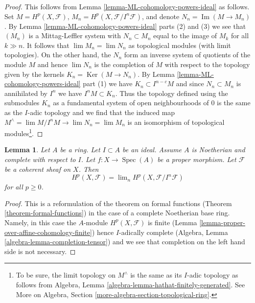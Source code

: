 \documentclass{stacks-project}
\theoremstyle{plain}
\newtheorem{lemma}[subsection]{Lemma}
\theoremstyle{definition}
\theoremstyle{remark}
\numberwithin{equation}{subsection}
\def\lim{\mathop{\mathrm{lim}}\nolimits}
\def\Spec{\mathop{\mathrm{Spec}}}
\def\Ker{\mathop{\mathrm{Ker}}}
\def\Im{\mathop{\mathrm{Im}}}
\begin{document}
\begin{proof}
This follows from Lemma \ref{lemma-ML-cohomology-powers-ideal} as follows.
Set $M = H^p(X, \mathcal{F})$, $M_n = H^p(X, \mathcal{F}/I^n\mathcal{F})$,
and denote $N_n = \Im(M \to M_n)$. By
Lemma \ref{lemma-ML-cohomology-powers-ideal} parts (2) and (3) we see that
$(M_n)$ is a Mittag-Leffler system with
$N_n \subset M_n$ equal to the image of $M_k$ for all $k \gg n$.
It follows that $\lim M_n = \lim N_n$ as topological modules (with limit
topologies). On the other hand, the $N_n$ form an inverse system of quotients
of the module $M$ and hence $\lim N_n$ is the completion of $M$
with respect to the topology given by the kernels $K_n = \Ker(M \to N_n)$.
By Lemma \ref{lemma-ML-cohomology-powers-ideal} part (1)
we have $K_n \subset I^{n - c}M$ and since $N_n \subset M_n$
is annihilated by $I^n$ we have $I^n M \subset K_n$.
Thus the topology defined using the submodules $K_n$
as a fundamental system of open neighbourhoods of $0$
is the same as the $I$-adic topology and we find that the
induced map $M^\wedge = \lim M/I^nM \to \lim N_n = \lim M_n$
is an isomorphism of topological modules\footnote{
To be sure, the limit topology on $M^\wedge$ is the same as its
$I$-adic topology as follows from
Algebra, Lemma \ref{algebra-lemma-hathat-finitely-generated}.
See More on Algebra, Section \ref{more-algebra-section-topological-ring}.}.
\end{proof}

\begin{lemma}
\label{lemma-spell-out-theorem-formal-functions}
Let $A$ be a ring. Let $I \subset A$ be an ideal. Assume $A$ is
Noetherian and complete with respect to $I$.
Let $f : X \to \Spec(A)$ be a proper morphism.
Let $\mathcal{F}$ be a coherent sheaf on $X$.
Then
$$
H^p(X, \mathcal{F}) = \lim_n H^p(X, \mathcal{F}/I^n\mathcal{F})
$$
for all $p \geq 0$.
\end{lemma}

\begin{proof}
This is a reformulation of the theorem on formal functions
(Theorem \ref{theorem-formal-functions}) in the
case of a complete Noetherian base ring. Namely, in this case the
$A$-module $H^p(X, \mathcal{F})$ is finite
(Lemma \ref{lemma-proper-over-affine-cohomology-finite}) hence
$I$-adically complete (Algebra, Lemma \ref{algebra-lemma-completion-tensor})
and we see that completion on the left hand side is not necessary.
\end{proof}
\end{document}
